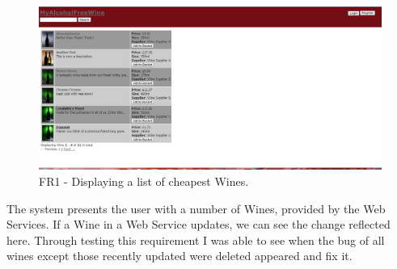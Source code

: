\documentclass[12pt]{article}
\begin{document}
\begin{figure}[H]
        \centering
                \includegraphics[width=1\textwidth]{assets/FR1_screen_1}
                \caption{FR1 - Displaying a list of cheapest Wines.}
                \label{fig: FR1_1.} 
\end{figure}
The system presents the user with a number of Wines, provided by the Web Services. If a Wine in a Web Service updates, we can see the change reflected here. Through testing this requirement I was able to see when the bug of all wines except those recently updated were deleted appeared and fix it.
\end{document}
